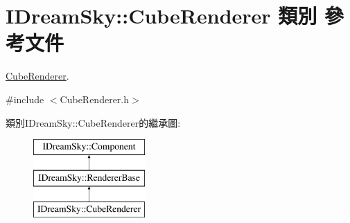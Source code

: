 \hypertarget{class_i_dream_sky_1_1_cube_renderer}{}\section{I\+Dream\+Sky\+:\+:Cube\+Renderer 類別 參考文件}
\label{class_i_dream_sky_1_1_cube_renderer}


\hyperlink{class_i_dream_sky_1_1_cube_renderer}{Cube\+Renderer}.  




{\ttfamily \#include $<$Cube\+Renderer.\+h$>$}

類別\+I\+Dream\+Sky\+:\+:Cube\+Renderer的繼承圖\+:\begin{figure}[H]
\begin{center}
\leavevmode
\includegraphics[height=3.000000cm]{class_i_dream_sky_1_1_cube_renderer}
\end{center}
\end{figure}
